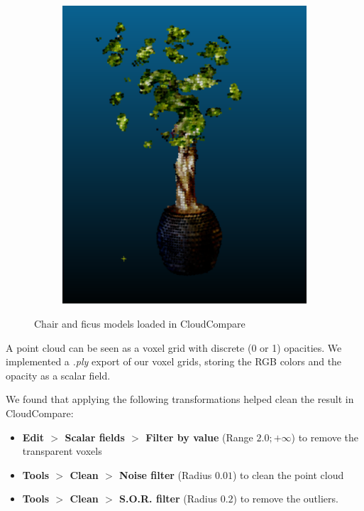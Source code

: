 \documentclass{article}
\begin{document}
\begin{figure}[!h]
\begin{subfigure}{.24\textwidth}
\end{subfigure}
\begin{subfigure}{.24\textwidth}
  \centering
  \includegraphics[width=\linewidth]{figs/pc/ficusc.png}  
\end{subfigure}
     \caption{Chair and ficus models loaded in CloudCompare}
    \label{fig:cc}
\end{figure}

A point cloud can be seen as a voxel grid with discrete (0 or 1) opacities. We implemented a \textit{.ply} export of our voxel grids, storing the RGB colors and the opacity as a scalar field. 

We found that applying the following transformations helped clean the result in CloudCompare:

\begin{itemize}
\item \textbf{Edit $>$ Scalar fields $>$ Filter by value} (Range $2.0; +\infty$) to remove the transparent voxels
\item \textbf{Tools $>$ Clean $>$ Noise filter} (Radius $0.01$) to clean the point cloud
\item \textbf{Tools $>$ Clean $>$ S.O.R. filter} (Radius $0.2$) to remove the outliers.
\end{itemize}
\end{document}

